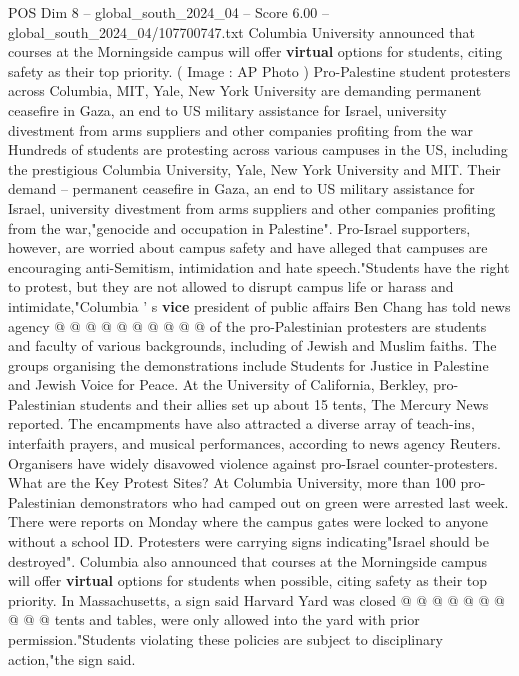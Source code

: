 \begin{textsample}{POS Dim 8 – global\_south\_2024\_04 – Score 6.00 – global\_south\_2024\_04/107700747.txt}  \label{ex:f8_pos_193}
Columbia University announced that courses at the Morningside campus will offer \textbf{virtual} options for students, citing safety as their top priority. ( Image : AP Photo ) Pro-Palestine student protesters across Columbia, MIT, Yale, New York University are demanding permanent ceasefire in Gaza, an end to US military assistance for Israel, university divestment from arms suppliers and other companies profiting from the war Hundreds of students are protesting across various campuses in the US, including the prestigious Columbia University, Yale, New York University and MIT.
Their demand -- permanent ceasefire in Gaza, an end to US military assistance for Israel, university divestment from arms suppliers and other companies profiting from the war,"genocide and occupation in Palestine".
Pro-Israel supporters, however, are worried about campus safety and have alleged that campuses are encouraging anti-Semitism, intimidation and hate speech."Students have the right to protest, but they are not allowed to disrupt campus life or harass and intimidate,"Columbia ' s \textbf{vice} president of public affairs Ben Chang has told news agency @ @ @ @ @ @ @ @ @ @ of the pro-Palestinian protesters are students and faculty of various backgrounds, including of Jewish and Muslim faiths.
The groups organising the demonstrations include Students for Justice in Palestine and Jewish Voice for Peace.
At the University of California, Berkley, pro-Palestinian students and their allies set up about 15 tents, The Mercury News reported.
The encampments have also attracted a diverse array of teach-ins, interfaith prayers, and musical performances, according to news agency Reuters.
Organisers have widely disavowed violence against pro-Israel counter-protesters.
What are the Key Protest Sites?
At Columbia University, more than 100 pro-Palestinian demonstrators who had camped out on green were arrested last week.
There were reports on Monday where the campus gates were locked to anyone without a school ID.
Protesters were carrying signs indicating"Israel should be destroyed".
Columbia also announced that courses at the Morningside campus will offer \textbf{virtual} options for students when possible, citing safety as their top priority.
In Massachusetts, a sign said Harvard Yard was closed @ @ @ @ @ @ @ @ @ @ tents and tables, were only allowed into the yard with prior permission."Students violating these policies are subject to disciplinary action,"the sign said.

\end{textsample}
